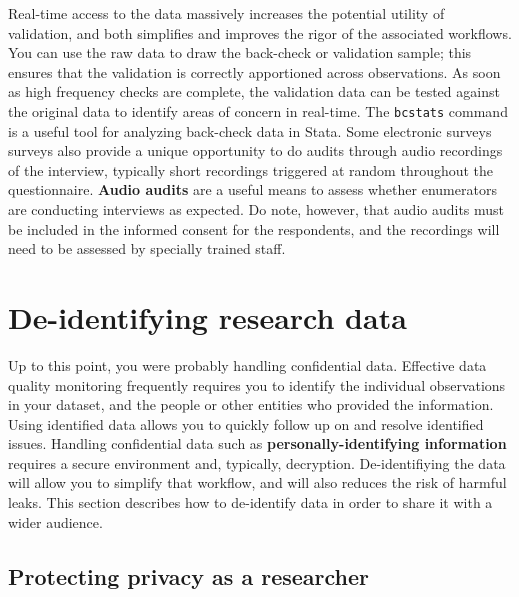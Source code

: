 Real-time access to the data massively increases the potential utility of validation,
and both simplifies and improves the rigor of the associated workflows.
You can use the raw data to draw the back-check or validation sample;
this ensures that the validation is correctly apportioned across observations.
As soon as high frequency checks are complete, 
the validation data can be tested against
the original data to identify areas of concern in real-time.
The \texttt{bcstats} command is a useful tool for analyzing back-check data in Stata.
Some electronic surveys surveys also provide a unique opportunity
to do audits through audio recordings of the interview,
typically short recordings triggered at random throughout the questionnaire.
\textbf{Audio audits} are a useful means to assess whether enumerators are conducting interviews as expected.
Do note, however, that audio audits must be included in the informed consent for the respondents,
and the recordings will need to be assessed by specially trained staff.


\section{De-identifying research data}

Up to this point, you were probably handling confidential data.
Effective data quality monitoring
frequently requires you to identify the individual observations in your dataset,
and the people or other entities who provided the information.
Using identified data allows you to quickly follow up on and resolve identified issues.
Handling confidential data such as \textbf{personally-identifying information}
requires a secure environment and, typically, decryption.
De-identifiying the data will allow you to simplify that workflow, 
and will also reduces the risk of harmful leaks.
This section describes how to de-identify data in order to share it with a wider audience.

\subsection{Protecting privacy as a researcher}

